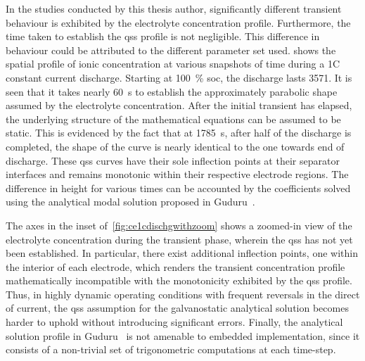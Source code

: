 In  the  studies  conducted  by  this  thesis  author,  significantly  different
transient  behaviour  is exhibited  by  the  electrolyte concentration  profile.
Furthermore,  the  time  taken  to   establish  the  \gls{qss}  profile  is  not
negligible. This  difference in behaviour  could be attributed to  the different
parameter  set used.    shows  the spatial  profile
of  ionic concentration  at  various  snapshots of  time  during  a 1C  constant
current discharge. Starting at \SI{100}{\percent} \gls{soc}, the discharge lasts
\SI{3571}{\sec}. It is  seen that it takes nearly  \SI{60}{\second} to establish
the  approximately parabolic  shape  assumed by  the electrolyte  concentration.
After  the  initial transient  has  elapsed,  the  underlying structure  of  the
mathematical equations  can be assumed  to be static.  This is evidenced  by the
fact that at \SI{1785}{\second}, \ie{} after half of the discharge is completed,
the shape of the curve is nearly  identical to the one towards end of discharge.
These  \gls{qss} curves  have their  sole inflection  points at  their separator
interfaces and remains monotonic within  their respective electrode regions. The
difference in  height for  various times  can be  accounted by  the coefficients
solved using the analytical modal solution proposed in Guduru~\etal{}.

The  axes  in  the  inset  of~\cref{fig:ce1cdischgwithzoom}  shows  a  zoomed-in
view  of  the electrolyte  concentration  during  the transient  phase,  wherein
the  \gls{qss}  has  not  yet  been  established.  In  particular,  there  exist
additional inflection points,  one within the interior of  each electrode, which
renders the transient concentration profile mathematically incompatible with the
monotonicity  exhibited  by  the  \gls{qss} profile.  Thus,  in  highly  dynamic
operating  conditions with  frequent reversals  in  the direct  of current,  the
\gls{qss} assumption for the galvanostatic analytical solution becomes harder to
uphold without introducing significant  errors. Finally, the analytical solution
profile in Guduru~\etal{}  is not amenable to embedded  implementation, since it
consists of a non-trivial set of trigonometric computations at each time-step.

